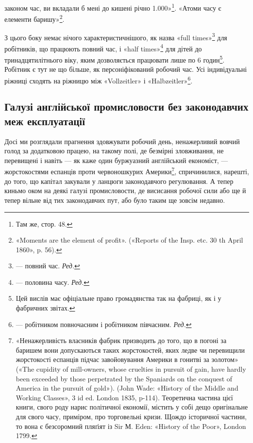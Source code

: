 \parcont{}  %
законом час, ви вкладали б мені до кишені річно \num{1.000}»\footnote{
Там же, стор. 48.
}. «Атоми часу є елементи баришу»\footnote{
«Moments are the element of profit». («Reports of the Insp. etc.
30 th April 1860», p. 56).
}.

З цього боку немає нічого характеристичнішого, як назва
«full times»\footnote*{
— повний час. \emph{Ред.}
} для робітників, що працюють повний час, і «half
times»\footnote*{
— половина часу. \emph{Ред.}
} для дітей до тринадцятилітнього віку, яким дозволяється
працювати лише по 6 годин\footnote{
Цей вислів має офіціальне право громадянства так на фабриці,
як і у фабричних звітах.
}. Робітник є тут не що більше,
як персоніфікований робочий час. Усі індивідуальні ріжниці
сходять на ріжницю між «Vollzeitler» і «Halbzeitler»\footnote*{
— робітником повночасним і робітником півчасним. \emph{Ред.}
}.

\subsection{Галузі англійської промисловости без законодавчих меж
експлуатації}

Досі ми розглядали прагнення здовжувати робочий день,
ненажерливий вовчий голод за додатковою працею, на такому
полі, де безмірні зловживання, не перевищені і навіть — як каже
один буржуазний англійський економіст, — жорстокостями еспанців
проти червоношкурих Америки\footnote{
«Ненажерливість власників фабрик призводить до того, що в погоні
за баришем вони допускаються таких жорстокостей, яких ледве чи
перевищили жорстокості еспанців підчас завойовування Америки в гонитві
за золотом» («The cupidity of mill-owners, whose cruelties in pursuit
of gain, have hardly been exceeded by those perpetrated by the Spaniards
on the conquest of America in the pursuit of gold»). (John Wade:
«History of the Middle and Working Classes», 3 id ed. London 1835, p-114).
Теоретична частина цієї книги, свого роду нарис політичної економії,
містить у собі дещо оригінальне для свого часу, приміром, про торговельні
кризи. Щождо історичної частини, то вона є безсоромний пляґіят із Sir
М. Eden: «History of the Poor», London 1799.
}, спричинилися, нарешті,
до того, що капітал закували у ланцюги законодавчого регулювання.
А тепер киньмо оком на деякі галузі промисловости, де
висисання робочої сили або ще й тепер вільне від тих законодавчих
пут, або було таким ще зовсім недавно.

